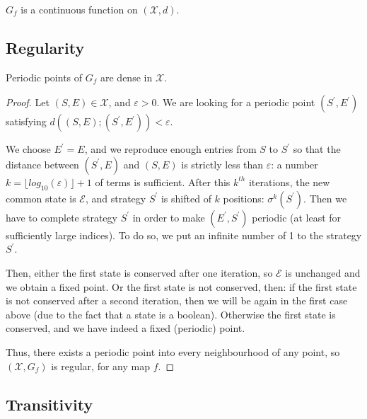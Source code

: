 \begin{proposition}
\label{continuite} $G_f$ is a continuous function on $(\mathcal{X},d)$.
\end{proposition}

\subsection{Regularity}

\label{regularite}

\begin{theorem}
Periodic points of $G_{f}$ are dense in $\mathcal{X}$.
\end{theorem}

\begin{proof}
Let $(S,E)\in \mathcal{X}$, and $\varepsilon >0$. We are looking for a
periodic point $(S^{\prime },E^{\prime })$ satisfying $d((S,E);(S^{\prime
},E^{\prime }))<\varepsilon$.

We choose $E^{\prime }=E$, and we reproduce enough entries from $S$ to $%
S^{\prime }$ so that the distance between $(S^{\prime },E)$ and $(S,E)$ is
strictly less than $\varepsilon $: a number $k=\lfloor log_{10}(\varepsilon
)\rfloor +1$ of terms is sufficient.\newline
After this $k^{th}$ iterations, the new common state is $\mathcal{E}$, and
strategy $S^{\prime }$ is shifted of $k$ positions: $\sigma ^{k}(S^{\prime })$.\newline
Then we have to complete strategy $S^{\prime }$ in order to make $(E^{\prime
},S^{\prime })$ periodic (at least for sufficiently large indices). To do
so, we put an infinite number of 1 to the strategy $S^{\prime }$.

Then, either the first state is conserved after one iteration, so $\mathcal{E%
}$ is unchanged and we obtain a fixed point. Or the first state is not
conserved, then: if the first state is not conserved after a second
iteration, then we will be again in the first case above (due to the fact that a state is a boolean). Otherwise the first state is conserved, and we have
indeed a fixed (periodic) point.

Thus, there exists a periodic point into every neighbourhood of any point, so 
$(\mathcal{X},G_f)$ is regular, for any map $f$.
\end{proof}

\subsection{Transitivity}

